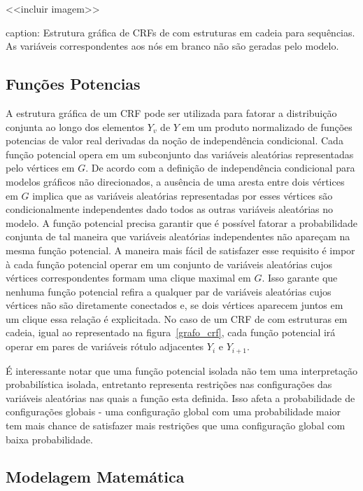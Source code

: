 <<incluir imagem>>

caption: Estrutura gráfica de CRFs de com estruturas em cadeia para sequências.
As variáveis correspondentes aos nós em branco não são geradas pelo modelo.

\subsection{Funções Potencias}

A estrutura gráfica de um CRF pode ser utilizada para fatorar a distribuição conjunta
ao longo dos elementos $Y_v$ de $Y$ em um produto normalizado de funções potencias de
valor real derivadas da noção de independência condicional. Cada função potencial
opera em um subconjunto das variáveis aleatórias representadas pelo vértices em $G$.
De acordo com a definição de independência condicional para modelos gráficos não
direcionados, a ausência de uma aresta entre dois vértices em $G$ implica que as variáveis
aleatórias representadas por esses vértices são condicionalmente independentes dado todos
as outras variáveis aleatórias no modelo. A função potencial precisa garantir que é
possível fatorar a probabilidade conjunta de tal maneira que variáveis aleatórias
independentes não apareçam na mesma função potencial. A maneira mais fácil de satisfazer
esse requisito é impor à cada função potencial operar em um conjunto de variáveis aleatórias
cujos vértices correspondentes formam uma clique maximal em $G$. Isso garante que nenhuma
função potencial refira a qualquer par de variáveis aleatórias cujos vértices não são
diretamente conectados e, se dois vértices aparecem juntos em um clique essa relação é
explicitada. No caso de um CRF de com estruturas em cadeia, igual ao representado na
figura~\ref{grafo_crf}, cada função potencial irá operar em pares de variáveis rótulo adjacentes
$Y_i$ e $Y_{i+1}$.

É interessante notar que uma função potencial isolada não tem uma interpretação probabilística
isolada, entretanto representa restrições nas configurações das variáveis aleatórias nas quais
a função esta definida. Isso afeta a probabilidade de configurações globais - uma configuração
global com uma probabilidade maior tem mais chance de satisfazer mais restrições que uma
configuração global com baixa probabilidade.

\subsection{Modelagem Matemática}

